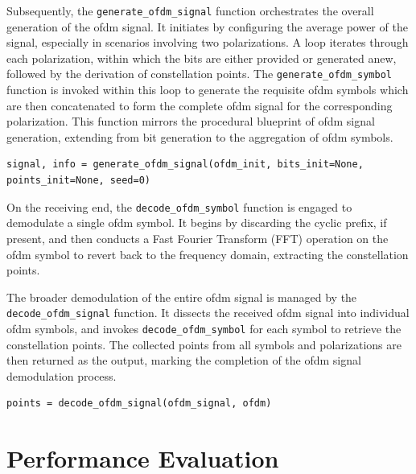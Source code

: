 Subsequently, the \texttt{generate\_ofdm\_signal} function orchestrates the overall generation of the \acrshort{ofdm} signal. It initiates by configuring the average power of the signal, especially in scenarios involving two polarizations. A loop iterates through each polarization, within which the bits are either provided or generated anew, followed by the derivation of constellation points. The \texttt{generate\_ofdm\_symbol} function is invoked within this loop to generate the requisite \acrshort{ofdm} symbols which are then concatenated to form the complete \acrshort{ofdm} signal for the corresponding polarization. This function mirrors the procedural blueprint of \acrshort{ofdm} signal generation, extending from bit generation to the aggregation of \acrshort{ofdm} symbols.

\begin{lstlisting}
signal, info = generate_ofdm_signal(ofdm_init, bits_init=None, points_init=None, seed=0)
\end{lstlisting}

On the receiving end, the \texttt{decode\_ofdm\_symbol} function is engaged to demodulate a single \acrshort{ofdm} symbol. It begins by discarding the cyclic prefix, if present, and then conducts a Fast Fourier Transform (FFT) operation on the \acrshort{ofdm} symbol to revert back to the frequency domain, extracting the constellation points.

The broader demodulation of the entire \acrshort{ofdm} signal is managed by the \texttt{decode\_ofdm\_signal} function. It dissects the received \acrshort{ofdm} signal into individual \acrshort{ofdm} symbols, and invokes \texttt{decode\_ofdm\_symbol} for each symbol to retrieve the constellation points. The collected points from all symbols and polarizations are then returned as the output, marking the completion of the \acrshort{ofdm} signal demodulation process.

\begin{lstlisting}
points = decode_ofdm_signal(ofdm_signal, ofdm)
\end{lstlisting}





\section{Performance Evaluation}

